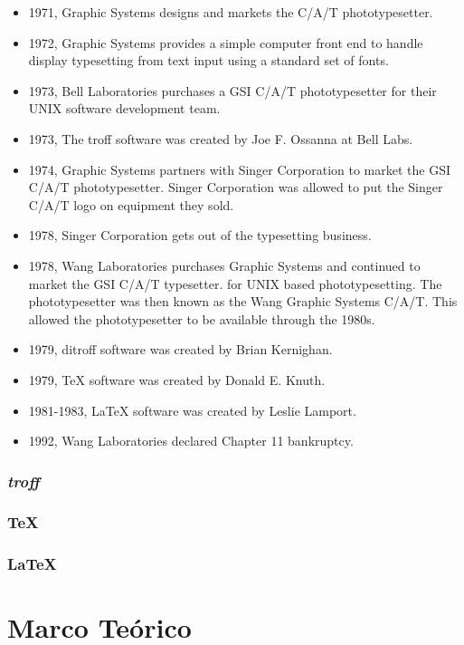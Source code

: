 \documentclass[12pt,letterpaper,titlepage,oneside,openright]{book}
\newcommand{\OhTeX}{%
    \makebox[0.76em][c]{O}%
    \makebox[0.25em][c]{%
        \raisebox{0.14em}[0em][0em]{%
            \fontsize{0.5em}{0cm}%
                \selectfont H%
        }%
    }%
    \makebox[1.35em][c]{\TeX}%
}
\newcommand{\ohtex}{\OhTeX\xspace}
\begin{document}
\begin{itemize}

\item 1971, Graphic Systems designs and markets the C/A/T phototypesetter.
\item 1972, Graphic Systems provides a simple computer front end to handle display typesetting from text input using a standard set of fonts.
\item 1973, Bell Laboratories purchases a GSI C/A/T phototypesetter for their UNIX software development team.
\item 1973, The troff software was created by Joe F. Ossanna at Bell Labs.
\item 1974, Graphic Systems partners with Singer Corporation to market the GSI C/A/T phototypesetter. Singer Corporation was allowed to put the Singer C/A/T logo on equipment they sold.
\item 1978, Singer Corporation gets out of the typesetting business.
\item 1978, Wang Laboratories purchases Graphic Systems and continued to market the GSI C/A/T typesetter. for UNIX based phototypesetting. The phototypesetter was then known as the Wang Graphic Systems C/A/T. This allowed the phototypesetter to be available through the 1980s.
\item 1979, ditroff software was created by Brian Kernighan.
\item 1979, TeX software was created by Donald E. Knuth.
\item 1981-1983, LaTeX software was created by Leslie Lamport.
\item 1992, Wang Laboratories declared Chapter 11 bankruptcy.
\end{itemize}

\subsection{\textit{troff}}
\subsection{\TeX}
\subsection{\LaTeX}
\subsection[OhTeX]{\ohtex}

\chapter{Marco Teórico}
\end{document}
